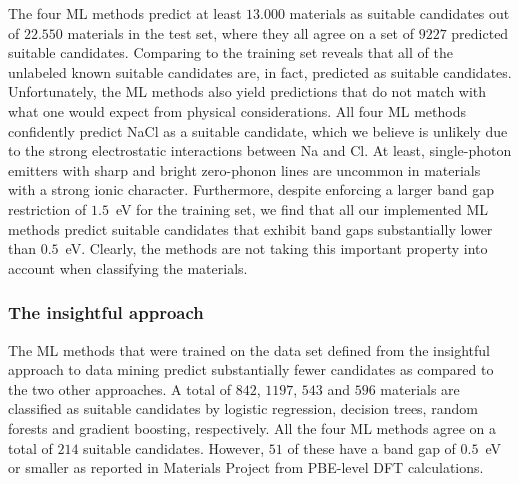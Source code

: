 \documentclass[superscriptaddress,unsortedaddress,
 amsmath,amssymb,
 aps,
]{revtex4-2}
\begin{document}
The four ML methods predict at least $13.000$ materials as suitable candidates out of $22.550$ materials in the test set, where they all agree on a set of $9227$ predicted suitable candidates. Comparing to the training set reveals that all of the unlabeled known suitable candidates are, in fact, predicted as suitable candidates. Unfortunately, the ML methods also yield predictions that do not match with what one would expect from physical considerations. 
All four ML methods confidently predict NaCl as a suitable candidate, which we believe is unlikely due to the strong electrostatic interactions between Na and Cl. 
At least, single-photon emitters with sharp and bright zero-phonon lines are uncommon in materials with a strong ionic character. 
Furthermore, despite enforcing a larger band gap restriction of $1.5$~eV for the training set, we find that all our implemented ML methods  predict suitable candidates that exhibit band gaps substantially lower than $0.5$~eV.
Clearly, the methods are not taking this important property into account when classifying the materials. 
 
\subsubsection*{The insightful approach}
The ML methods that were trained on the data set defined from the insightful approach to data mining predict substantially fewer candidates as compared to the two other approaches. 
A total of $842$, $1197$, $543$ and $596$ materials are classified as suitable candidates by logistic regression, decision trees, random forests and gradient boosting, respectively. All the four ML methods agree on a total of $214$ suitable candidates. However, $51$ of these have a band gap of $0.5$~eV or smaller as reported in Materials Project from PBE-level DFT calculations.  

\end{document}

